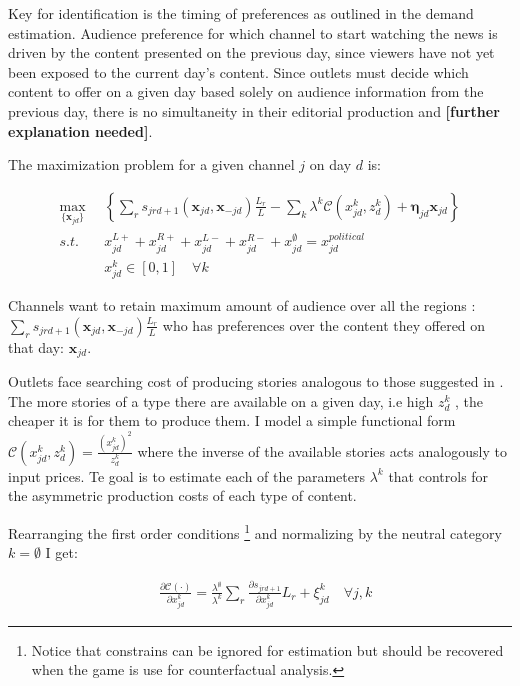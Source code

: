 \documentclass[12pt]{article}
\begin{document}
	Key for identification is the timing of preferences as outlined in the demand estimation. Audience preference for which channel to start watching the news is driven by the content presented on the previous day, since viewers have not yet been exposed to the current day’s content. Since outlets must decide which content to offer on a given day based solely on audience information from the previous day, there is no simultaneity in their editorial production and \textbf{[further explanation needed]}.
	
	
	
	The maximization problem for a  given channel $j$ on  day $d$ is:
	
	\begin{equation}\label{}
		\begin{aligned}
			\max_{\{\mathbf{x}_{jd}\}}   & \left\{   \sum_{r}s_{jrd+1}(\bm{x}_{jd}, \bm{x}_{-jd})\frac{L_r}{L} - \sum_k {\lambda^k}\mathcal{C}({x}^k_{jd}, {z}^k_d)+ \bm{\eta}_{jd}\bm{x}_{jd} \right\}\\
			s.t.   \quad &   x_{jd}^{L+} +x_{jd}^{R+} + x_{jd}^{L-} + x_{jd}^{R-} + x_{jd}^{\emptyset} = x_{jd}^{political}\\
			& x_{jd}^k \in [0,1] \quad \forall k
		\end{aligned}
	\end{equation} 
	
	
Channels want to retain maximum amount of audience over all the regions :$\sum_{r}s_{jrd+1}(\bm{x}_{jd}, \bm{x}_{-jd})\frac{L_r}{L} $ who has preferences over the content they offered on that day:  $\mathbf{x}_{jd}$. 
	
Outlets face searching cost of producing stories analogous to those suggested in \citep{SimonovRao2022}. The more stories of a type there are available on a given day, i.e high $z_d^k $ , the cheaper it is for them to produce them. I model a simple functional form $ \mathcal{C}({x}_{jd}^k, {z}_d^k) = \frac{(x_{jd}^k) ^2}{z_d^k}$ where the inverse of the available stories acts analogously to input prices. Te goal is to estimate each of the parameters $\lambda^k$ that controls for the asymmetric production costs of each type of content. 
	
	Rearranging the first order conditions \footnote{Notice that constrains can be ignored for estimation but should be recovered when the game is use for counterfactual analysis. } and normalizing by the neutral category $k= \emptyset$  I get:
	
		\begin{equation}
		\begin{aligned}
			&   \frac{\partial \mathcal{C}(\cdot)}{\partial x_{jd}^k}  =\frac{\lambda^\emptyset}{\lambda^k} \sum_{r} \frac{\partial s_{jrd+1}}{\partial x_{jd}^k}L_r + \xi^k_{jd} \quad \forall j,k 
		\end{aligned}
		\label{eq:focs}
	\end{equation} 
	
\end{document}
